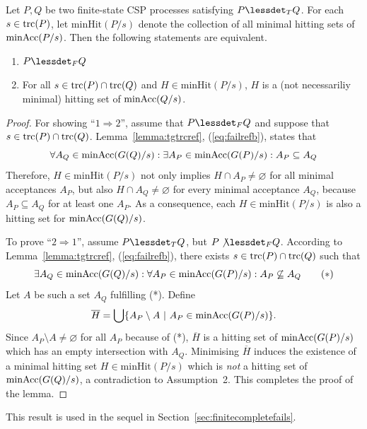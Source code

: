 \begin{lemma}
\label{lemma:hseta}
Let $P, Q$ be two finite-state CSP processes satisfying $P\lessdet_T Q$.
For each $s\in\text{trc}(P)$,
let $\text{minHit}(P/s)$ denote the
collection of all minimal hitting sets of $\text{minAcc}(P/s)$.
Then the following statements are equivalent.
\begin{enumerate}
\item $P\lessdet_F Q$ 
\item For all $s\in\text{trc}(P)\cap \text{trc}(Q)$ and $H \in  \text{minHit}(P/s)$, $H$ is
a (not necessariliy minimal) hitting set of $\text{minAcc}(Q/s)$.
\end{enumerate}
\end{lemma}
\begin{proof}
For showing ``$1 \Rightarrow 2$'', assume that $P\lessdet_F Q$ and suppose
that $s\in\text{trc}(P)\cap \text{trc}(Q)$. Lemma~\ref{lemma:tgtrcref},
(\ref{eq:failrefb}), states that
\[
\forall A_Q\in\text{minAcc}(G(Q)/s):
\exists A_P\in\text{minAcc}(G(P)/s): A_P\subseteq A_Q
\]
Therefore, $H \in  \text{minHit}(P/s)$ not only implies $H\cap
A_P\neq\varnothing$ for all minimal acceptances $A_P$, but also $H\cap
A_Q\neq\varnothing$ for every minimal acceptance $A_Q$, because $A_P\subseteq
A_Q$ for at least one $A_P$. As a consequence, each $H \in
\text{minHit}(P/s)$ is also a hitting set for $\text{minAcc}(G(Q)/s)$.

To prove ``$2 \Rightarrow 1$'', assume $P\lessdet_T Q$, but $P\not\lessdet_F
Q$. According to Lemma~\ref{lemma:tgtrcref}, (\ref{eq:failrefb}), there
exists $s\in\text{trc}(P)\cap \text{trc}(Q)$ such that
\[
\exists A_Q\in\text{minAcc}(G(Q)/s): \forall A_P\in\text{minAcc}(G(P)/s): A_P\not\subseteq A_Q
\qquad (*)
\]
Let $A$ be such a set $A_Q$ fulfilling (*).
Define
\[
\overline H = \bigcup\{ A_P \setminus A~|~A_P\in\text{minAcc}(G(P)/s) \}.
\]
Since $A_P \setminus A \neq\varnothing$ for all $A_P$ because of (*),
$\overline H$ is a hitting set of $\text{minAcc}(G(P)/s)$ which has an  empty
intersection with $A_Q$. %
Minimising $\overline H$ induces the existence of a minimal hitting set $H\in
\text{minHit}(P/s)$ which is {\it not} a hitting set of $\text{minAcc}(G(Q)/s)$, a
contradiction to Assumption~2. This completes the proof of the lemma. \xbox
\end{proof}
%
This result is used in the sequel in Section~\ref{sec:finitecompletefails}.

%
%
